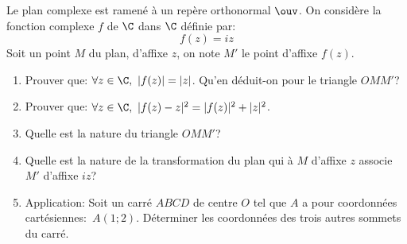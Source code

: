 \begin{exercice}
Le plan complexe est ramen\'e \`a un rep\`ere orthonormal $\ouv$.
  On consid\`ere la fonction
complexe $f$ de $\C$ dans $\C$ d\'efinie par:
\[f(z)=iz\]
Soit un point $M$ du plan, d'affixe $z$, on note $M'$ le point
d'affixe $f(z)$.
\begin{enumerate}
\item Prouver que: $\forall z \in\C,\ |f(z)|=|z|$. Qu'en d\'eduit-on
  pour le triangle $OMM'$?
\item Prouver que: $\forall z \in\C,\ |f(z)-z|^2=|f(z)|^2+|z|^2$.
\item Quelle est la nature du triangle $OMM'$?

\item Quelle est la nature de la transformation du plan qui \`a $M$
  d'affixe $z$ associe $M'$ d'affixe $iz$?
\item Application: Soit un carr\'e $ABCD$ de centre $O$ tel que $A$ a
  pour coordonn\'ees cart\'esiennes:~$A(1;2)$. D\'eterminer les
  coordonn\'ees des trois autres sommets du carr\'e.
\end{enumerate}
\end{exercice}
